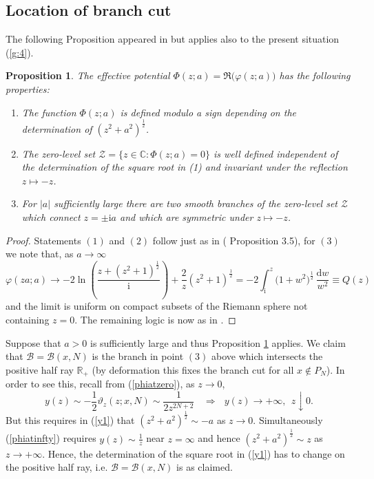 \documentclass[10pt,reqno,oneside]{amsart}
\renewcommand{\d}{{\mathrm d}}
\newcommand{\im}{\mathrm{i}}
\numberwithin{equation}{section}
\newtheorem{proposition}[theo]{Proposition}
\def\bp{\begin{proposition}}
\def\ep{\end{proposition}}
\def\eqref#1{(\ref{#1})}
\begin{document}
\subsection{Location of branch cut}\label{bcut}
The following Proposition appeared in \cite{BB} but applies also to the present situation \eqref{g:4}.
\bp 
\label{cutBg0}
The effective potential $\Phi(z;a)=\Re\big(\varphi(z;a)\big)$ has the following properties:
\begin{enumerate}
	\item The function $\Phi(z;a)$ is defined modulo a sign depending on the determination of $(z^2+a^2)^{\frac{1}{2}}$.
	\item The zero-level set $\mathcal{Z}=\{z\in\mathbb{C}: \Phi(z;a)=0\}$ is well defined independent of the determination of the square root in (1) and invariant under the reflection $z\mapsto -z$.
	\item For $|a|$ sufficiently large there are two smooth branches of the zero-level set $\mathcal{Z}$ which connect $z=\pm \im  a$ and which are symmetric under $z\mapsto -z$.
\end{enumerate}
\ep
\begin{proof} Statements $(1)$ and $(2)$ follow just as in (\cite{BB} Proposition 3.5), for $(3)$ we note that, as $a\rightarrow\infty$
\begin{equation}
	\varphi(za;a)\rightarrow -2\ln\left(\frac{z+(z^2+1)^{\frac{1}{2}}}{\im}\right)+\frac{2}{z}(z^2+1)^{\frac{1}{2}}=-2\int_{\im}^z\big(1+w^2\big)^{\frac{1}{2}}\,\frac{\d w}{w^2}\equiv Q(z)
\end{equation}
and the limit is uniform on compact subsets of the Riemann sphere not containing $z=0$. The remaining logic is now as in \cite{BB}.
\end{proof}
%
%
Suppose that $a>0$ is sufficiently large and thus Proposition \ref{cutBg0} applies. We claim that $\mathcal{B}=\mathcal{B}(x,N)$ is the branch in point $(3)$ above which intersects the positive half ray $\mathbb{R}_+$ (by deformation this fixes the branch cut for all $x\notin P_N$). In order to see this, recall from \eqref{phiatzero}, as $z\rightarrow 0$,
\begin{equation*}
	y(z)\sim-\frac{1}{2}\vartheta_z(z;x,N)\sim\frac{1}{2z^{2N+2}}\ \ \ \ \Rightarrow\ \ \ y(z)\rightarrow+\infty,\ \ z\downarrow 0.
\end{equation*}
But this requires in \eqref{y1} that $(z^2+a^2)^{\frac{1}{2}}\sim -a$ as $z\rightarrow0$. Simultaneously \eqref{phiatinfty} requires $y(z)\sim\frac{1}{z}$ near $z=\infty$ and hence $(z^2+a^2)^{\frac{1}{2}}\sim z$ as $z\rightarrow+\infty$. Hence, the determination of the square root in \eqref{y1} has to change on the positive half ray, i.e. $\mathcal{B}=\mathcal{B}(x,N)$ is as claimed.
 
\end{document}

